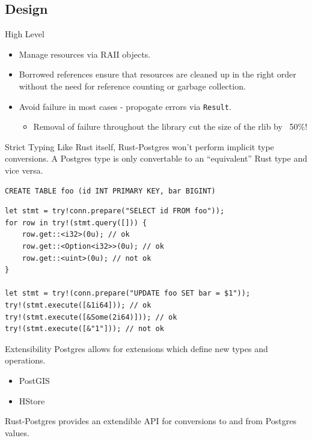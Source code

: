 \documentclass{beamer}
\begin{document}
\subsection{Design}

\begin{frame}[fragile]{High Level}
    \begin{itemize}
        \item Manage resources via RAII objects.
        \item Borrowed references ensure that resources are cleaned up in the right order without the need for reference counting or garbage collection.
        \item Avoid failure in most cases - propogate errors via \verb!Result!.
        \begin{itemize}
            \item Removal of failure throughout the library cut the size of the rlib by ~50\%!
        \end{itemize}
    \end{itemize}
\end{frame}

\begin{frame}[fragile]{Strict Typing}
    Like Rust itself, Rust-Postgres won't perform implicit type conversions. A
    Postgres type is only convertable to an ``equivalent'' Rust type and vice
    versa.
    \begin{verbatim}
CREATE TABLE foo (id INT PRIMARY KEY, bar BIGINT) 
    \end{verbatim}
    \begin{verbatim}
let stmt = try!conn.prepare("SELECT id FROM foo"));
for row in try!(stmt.query([])) {
    row.get::<i32>(0u); // ok
    row.get::<Option<i32>>(0u); // ok
    row.get::<uint>(0u); // not ok
}

let stmt = try!(conn.prepare("UPDATE foo SET bar = $1"));
try!(stmt.execute([&1i64])); // ok
try!(stmt.execute([&Some(2i64)])); // ok
try!(stmt.execute([&"1"])); // not ok
    \end{verbatim}
\end{frame}

\begin{frame}{Extensibility}
    Postgres allows for extensions which define new types and operations.
    \begin{itemize}
        \item PostGIS
        \item HStore
    \end{itemize}

    Rust-Postgres provides an extendible API for conversions to and from
    Postgres values.
\end{frame}
\end{document}
